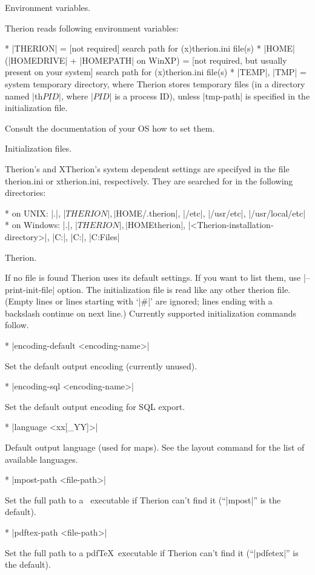 \subchapter Environment variables.

Therion reads following environment variables:

\list
* |THERION| = [not required] search path for (x)therion.ini file(s)
* |HOME| (|HOMEDRIVE| + |HOMEPATH| on WinXP) = 
  [not required, but usually present on your system] search path 
  for (x)therion.ini file(s)
* |TEMP|, |TMP| = system temporary directory, where Therion stores temporary 
  files (in a directory named |th$PID$|, where |$PID$| is a process ID),
  unless |tmp-path| is specified in the initialization file.
\endlist

Consult the documentation of your OS how to set them.

\subchapter Initialization files.

Therion's and XTherion's system dependent settings are specifyed in the 
file therion.ini or xtherion.ini, respectively.
They are searched for in the following directories:

\list
* on UNIX: 
  |.|, |$THERION|, |$HOME/.therion|, |/etc|, |/usr/etc|, |/usr/local/etc|
* on Windows:
  |.|, |$THERION|, |$HOME\.therion|, |<Therion-installation-directory>|, 
  |C:\WINDOWS|, |C:\WINNT|, |C:\Program Files\Therion|
\endlist
 
\subsubchapter Therion.

If no file is found Therion uses its default settings. If you want to list
them, use |--print-init-file| option. The initialization file is read 
like any other therion file. (Empty lines or lines starting with `|#|' are 
ignored; lines ending with a backslash continue on next line.) Currently 
supported initialization commands follow.

\list
* |encoding-default <encoding-name>|

  Set the default output encoding (currently unused).

* |encoding-sql <encoding-name>|

  Set the default output encoding for SQL export.
        
* |language <xx[_YY]>|  

  Default output language (used for maps). See the layout command for
  the list of available languages.

* |mpost-path <file-path>|

  Set the full path to a \MP\ executable if Therion can't find it 
  (``|mpost|'' is the default).

* |pdftex-path <file-path>|

  Set the full path to a pdf\TeX\ executable if Therion can't find it 
  (``|pdfetex|'' is the default).

